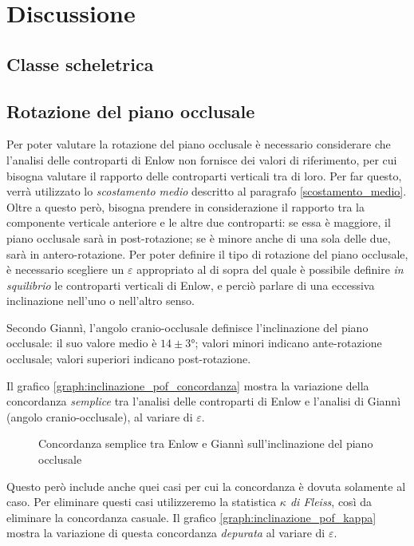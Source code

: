 \chapter{Discussione}

\section{Classe scheletrica}

\section{Rotazione del piano occlusale}
Per poter valutare la rotazione del piano occlusale è necessario considerare che l'analisi delle controparti di Enlow non fornisce dei valori di riferimento, per cui bisogna valutare il rapporto delle controparti verticali tra di loro. Per far questo, verrà utilizzato lo \emph{scostamento medio} descritto al paragrafo \vref{scostamento_medio}. Oltre a questo però, bisogna prendere in considerazione il rapporto tra la componente verticale anteriore e le altre due controparti: se essa è maggiore, il piano occlusale sarà in post-rotazione; se è minore anche di una sola delle due, sarà in antero-rotazione. Per poter definire il tipo di rotazione del piano occlusale, è necessario scegliere un $\varepsilon$ appropriato al di sopra del quale è possibile definire \emph{in squilibrio} le controparti verticali di Enlow, e perciò parlare di una eccessiva inclinazione nell'uno o nell'altro senso.

Secondo Giannì, l'angolo cranio-occlusale definisce l'inclinazione del piano occlusale: il suo valore medio è $14 \pm 3°$; valori minori indicano ante-rotazione occlusale; valori superiori indicano post-rotazione.

Il grafico \vref{graph:inclinazione_pof_concordanza} mostra la variazione della concordanza \emph{semplice} tra l'analisi delle controparti di Enlow e l'analisi di Giannì (angolo cranio-occlusale), al variare di $\varepsilon$.

\begin{figure}[ht!]
\centering

\caption{Concordanza semplice tra Enlow e Giannì sull'inclinazione del piano occlusale}
\label{graph:inclinazione_pof_concordanza}
\end{figure}

Questo però include anche quei casi per cui la concordanza è dovuta solamente al caso. Per eliminare questi casi utilizzeremo la statistica \emph{$\kappa$ di Fleiss}, così da eliminare la concordanza casuale. Il grafico \vref{graph:inclinazione_pof_kappa} mostra la variazione di questa concordanza \emph{depurata} al variare di $\varepsilon$.

